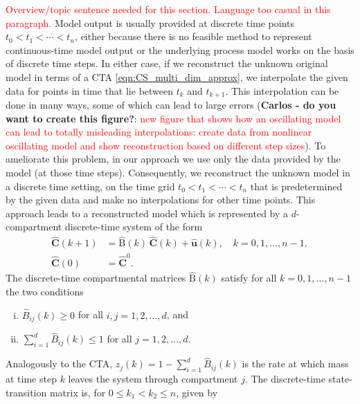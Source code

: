 \documentclass[11pt,a4paper]{article}
\newcommand{\red}[1]{\textcolor{red}{#1}}
\renewcommand{\vec}[1]{\mathbf{#1}}
\newcommand{\tens}[1]{\mathrm{#1}}
\newcommand{\suml}{\sum\limits}
\begin{document}
    \red{Overview/topic sentence needed for this section. Language too casual in this paragraph.} Model output is usually provided at discrete time points $t_0<t_1<\cdots<t_n$, either because there is no feasible method to represent continuous-time model output or the underlying process model works on the basis of discrete time steps.
    In either case, if we reconstruct the unknown original model in terms of a CTA \eqref{eqn:CS_multi_dim_approx}, we interpolate the given data for points in time that lie between $t_k$ and $t_{k+1}$.
    This interpolation can be done in many ways, some of which can lead to large errors (\textbf{Carlos - do you want to create this figure?}: \red{new figure that shows how an oscillating model can lead to totally misleading interpolations: create data from nonlinear oscillating model and show reconstruction based on different step sizes}).
    To ameliorate this problem, in our approach we use only the data provided by the model (at those time steps).
    Consequently, we reconstruct the unknown model in a discrete time setting, on the time grid $t_0<t_1<\cdots<t_n$ that is predetermined by the given data and make no interpolations for  other time points.
    This approach leads to a reconstructed model which is represented by a $d$-compartment discrete-time system of the form
    \begin{equation}\label{eqn:CS_discrete}
        \begin{aligned}
            \widehat{\vec{C}}(k+1) &= \widehat{\tens{B}}(k)\,\widehat{\vec{C}}(k) + \widehat{\vec{u}}(k),\quad k=0,1,\ldots,n-1,\\
            \widehat{\vec{C}}(0) &= \widehat{\vec{C}}^0.
        \end{aligned}
    \end{equation}
    The discrete-time compartmental matrices $\widehat{\tens{B}}(k)$ satisfy for all $k=0,1,\ldots,n-1$ the two conditions
    \begin{enumerate}[(i)]
        \item $\widehat{B}_{ij}(k)\geq0$ for all $i,j=1,2,\ldots,d$, and
        \item $\suml_{i=1}^d \widehat{B}_{ij}(k)\leq 1$ for all $j=1,2,\ldots,d$.
    \end{enumerate}
    Analogously to the CTA, $\widehat{z}_j(k)=1-\sum_{i=1}^d \widehat{B}_{ij}(k)$ is the rate at which mass at time step $k$ leaves the system through compartment $j$.
    The discrete-time state-transition matrix is, for $0\leq k_1<k_2\leq n$, given by
    
\end{document}
